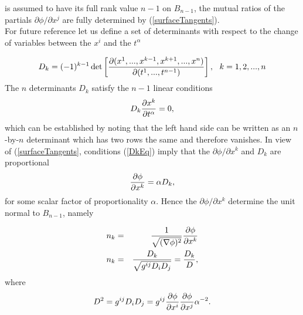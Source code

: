is assumed to have its full rank value $n-1$ on $B_{n-1}$, the mutual  ratios of the partials $\partial \phi / \partial x^j$ are fully determined by
(\ref{surfaceTangents}).\\

For future reference let us define a set of determinants with respect to the change of variables between the $x^i$ and the $t^\alpha$

\begin{equation}
 D_k = (-1)^{k-1} \det\left[ {\partial(x^1, ..., x^{k-1},x^{k+1},...,x^n)\over \partial (t^1, ..., t^{n-1})} \right], ~~k = 1,2,...,n \label{dsubk}
 \end{equation}
The $n$ determinants $D_k$ satisfy the $n-1$ linear conditions 
\begin{equation} D_k {\partial x^k\over \partial t^\alpha} = 0,\label{DkEq} \end{equation}
which can be established by noting that the left hand side can be written as an $n$-by-$n$ determinant which has two rows the same and therefore vanishes.
In view of (\ref{surfaceTangents}, conditions (\ref{DkEq}) imply that the $\partial \phi / \partial x^k$ and $D_k$ are proportional
\[ {\partial \phi\over \partial x^k} =  \alpha D_k,\] for some scalar factor of proportionality $\alpha$. Hence the $\partial \phi/ \partial x^k$ determine the unit 
normal to $B_{n-1}$, namely

\begin{eqnarray}
n_k &=& {1\over \sqrt{(\nabla \phi)^2}} {\partial \phi\over \partial x^k}\\
n_k &=& {D_k\over\sqrt{g^{ij} D_iD_j}} = {D_k\over D},\label{normB}
\end{eqnarray}
where \[ D^2 = g^{ij} D_iD_j = g^{ij} {\partial \phi\over \partial x^i} {\partial \phi\over \partial x^j } \alpha^{-2}.\]

